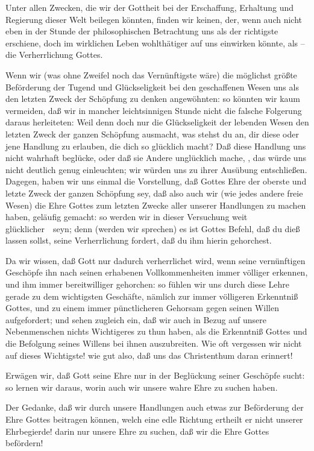 Unter allen Zwecken, die wir der Gottheit bei der Erschaffung, Erhaltung und Regierung dieser Welt beilegen könnten, finden wir keinen, der, wenn auch nicht eben in der Stunde der philosophischen Betrachtung uns als der richtigste erschiene, doch im wirklichen Leben wohlthätiger auf uns einwirken könnte, als -- die Verherrlichung Gottes.
\begin{aufza}
\item Wenn wir (was ohne Zweifel noch das Vernünftigste wäre) die möglichst größte Beförderung der Tugend und Glückseligkeit bei den geschaffenen Wesen uns als den letzten Zweck der Schöpfung zu denken angewöhnten: so könnten wir kaum vermeiden, daß wir in mancher leichtsinnigen Stunde nicht die falsche Folgerung daraus herleiteten: Weil denn doch nur die Glückseligkeit der lebenden Wesen den letzten Zweck der ganzen Schöpfung ausmacht, was stehst du an, dir diese oder jene Handlung zu erlauben, die dich so glücklich macht? Daß diese Handlung uns nicht wahrhaft beglücke, oder daß sie Andere unglücklich mache, \udgl , das würde uns nicht deutlich genug einleuchten; wir würden uns zu ihrer Ausübung entschließen. Dagegen, haben wir uns einmal die Vorstellung, daß Gottes Ehre der oberste und letzte Zweck der ganzen Schöpfung sey, daß also auch wir (wie jedes andere freie Wesen) die Ehre Gottes zum letzten Zwecke aller unserer Handlungen zu machen haben, geläufig gemacht: so werden wir in dieser Versuchung weit glücklicher~\ seyn; denn (werden wir sprechen) es ist Gottes Befehl, daß du dieß lassen sollst, seine Verherrlichung fordert, daß du ihm hierin gehorchest.
\item Da wir wissen, daß Gott nur dadurch verherrlichet wird, wenn seine vernünftigen Geschöpfe ihn nach seinen erhabenen Vollkommenheiten immer völliger erkennen, und ihm immer bereitwilliger gehorchen: so fühlen wir uns durch diese Lehre gerade zu dem wichtigsten Geschäfte, nämlich zur immer völligeren Erkenntniß Gottes, und zu einem immer pünctlicheren Gehorsam gegen seinen Willen aufgefordert; und sehen zugleich ein, daß wir auch in Bezug auf unsere Nebenmenschen nichts Wichtigeres zu thun haben, als die Erkenntniß Gottes und die Befolgung seines Willens bei ihnen auszubreiten. Wie oft vergessen wir nicht auf dieses Wichtigste! wie gut also, daß uns das Christenthum daran erinnert!
\item Erwägen wir, daß Gott seine Ehre nur in der Beglückung seiner Geschöpfe sucht: so lernen wir daraus, worin auch wir unsere wahre Ehre zu suchen haben.
\item Der Gedanke, daß wir durch unsere Handlungen auch etwas zur Beförderung der Ehre Gottes beitragen können, welch eine edle Richtung ertheilt er nicht unserer Ehrbegierde! darin nur unsere Ehre zu suchen, daß wir die Ehre Gottes befördern!

\end{aufza}

